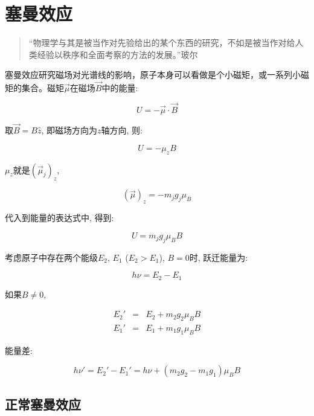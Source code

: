\section{塞曼效应}

\begin{quotation}
“物理学与其是被当作对先验给出的某个东西的研究，不如是被当作对给人类经验以秩序和全面考察的方法的发展。”\qquad 玻尔
\end{quotation}

塞曼效应研究磁场对光谱线的影响，原子本身可以看做是个小磁矩，或一系列小磁矩的集合。磁矩$\vec \mu$在磁场$\vec B$中的能量:

\begin{equation*}
U=-\vec \mu \cdot \vec B
\end{equation*}

取$\vec B = B \hat z$, 即磁场方向为$z$轴方向, 则:

\begin{equation*}
U=- \mu_z B
\end{equation*}

$\mu_z$就是$(\vec \mu_j)_z$,

\begin{equation*}
(\vec \mu)_z = - m_j g_j \mu_B
\end{equation*}

代入到能量的表达式中, 得到:

\begin{equation*}
U=m_j g_j \mu_B B
\end{equation*}

考虑原子中存在两个能级$E_2$, $E_1$ ($E_2 > E_1$), $B=0$时,
跃迁能量为:

\begin{equation*}
    h\nu =E_2 - E_1
\end{equation*}

如果$B \ne 0$,

\begin{eqnarray*}
  E_2' &=& E_2 + m_{2}g_{2}\mu_B B \\
  E_1' &=& E_1 + m_{1}g_{1}\mu_B B
\end{eqnarray*}

能量差:

\begin{equation*}
h\nu' = E_2' - E_1' = h\nu + (m_2g_2 -m_1g_1)\mu_B B
\end{equation*}



\subsection{正常塞曼效应}

